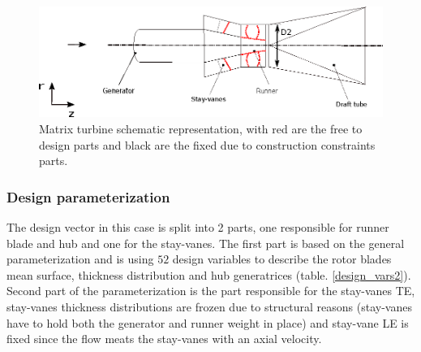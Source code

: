 \begin{figure}[h!]
\centering
\includegraphics[width=120mm]{gen_turb.eps}    
\caption{Matrix turbine schematic representation, with red are the free to design parts and black are the fixed due to construction constraints parts.  }
\label{Matrix_b}
\end{figure}

\subsubsection{Design parameterization}
The design vector in this case is split into 2 parts, one responsible for runner blade and hub and one for the stay-vanes. The first part is based on the general parameterization and is using $52$ design variables to describe the rotor blades mean surface, thickness distribution and hub generatrices (table. \ref{design_vars2}). Second part of the parameterization is the part responsible for the stay-vanes TE, stay-vanes thickness distributions are frozen due to structural reasons (stay-vanes have to hold both the generator and runner weight in place) and stay-vane LE is fixed since the flow meats the stay-vanes with an axial velocity.       

